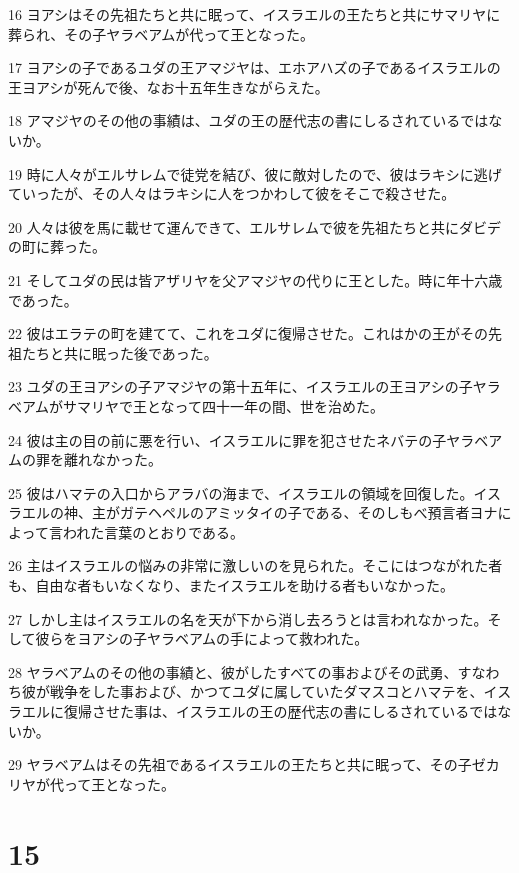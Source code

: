 \par 16 ヨアシはその先祖たちと共に眠って、イスラエルの王たちと共にサマリヤに葬られ、その子ヤラベアムが代って王となった。
\par 17 ヨアシの子であるユダの王アマジヤは、エホアハズの子であるイスラエルの王ヨアシが死んで後、なお十五年生きながらえた。
\par 18 アマジヤのその他の事績は、ユダの王の歴代志の書にしるされているではないか。
\par 19 時に人々がエルサレムで徒党を結び、彼に敵対したので、彼はラキシに逃げていったが、その人々はラキシに人をつかわして彼をそこで殺させた。
\par 20 人々は彼を馬に載せて運んできて、エルサレムで彼を先祖たちと共にダビデの町に葬った。
\par 21 そしてユダの民は皆アザリヤを父アマジヤの代りに王とした。時に年十六歳であった。
\par 22 彼はエラテの町を建てて、これをユダに復帰させた。これはかの王がその先祖たちと共に眠った後であった。
\par 23 ユダの王ヨアシの子アマジヤの第十五年に、イスラエルの王ヨアシの子ヤラべアムがサマリヤで王となって四十一年の間、世を治めた。
\par 24 彼は主の目の前に悪を行い、イスラエルに罪を犯させたネバテの子ヤラベアムの罪を離れなかった。
\par 25 彼はハマテの入口からアラバの海まで、イスラエルの領域を回復した。イスラエルの神、主がガテヘペルのアミッタイの子である、そのしもべ預言者ヨナによって言われた言葉のとおりである。
\par 26 主はイスラエルの悩みの非常に激しいのを見られた。そこにはつながれた者も、自由な者もいなくなり、またイスラエルを助ける者もいなかった。
\par 27 しかし主はイスラエルの名を天が下から消し去ろうとは言われなかった。そして彼らをヨアシの子ヤラベアムの手によって救われた。
\par 28 ヤラベアムのその他の事績と、彼がしたすべての事およびその武勇、すなわち彼が戦争をした事および、かつてユダに属していたダマスコとハマテを、イスラエルに復帰させた事は、イスラエルの王の歴代志の書にしるされているではないか。
\par 29 ヤラベアムはその先祖であるイスラエルの王たちと共に眠って、その子ゼカリヤが代って王となった。

\chapter{15}

